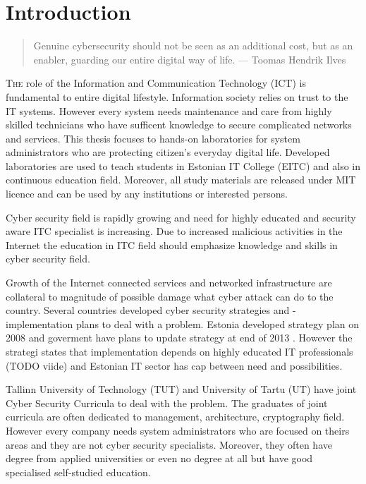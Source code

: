 \chapter{Introduction}
\label{Introduction}

 
\begin{quote}
Genuine cybersecurity should not be seen as an additional cost, but as an enabler, guarding our entire digital way of life. --- Toomas Hendrik Ilves
\end{quote}

\lettrine[lraise=0.1, nindent=0em, slope=-.5em]{\color{Violet}T}{he} role of the Information and Communication Technology (\gls{ICT}) is fundamental to entire digital lifestyle. Information society relies on trust to the IT systems. However every system needs maintenance and care from highly skilled technicians who have sufficent knowledge to secure complicated networks and services. This thesis focuses to hands-on laboratories for system administrators who are protecting citizen’s everyday digital life. Developed laboratories are used to teach students in Estonian IT College (\gls{EITC}) and also in continuous education field. Moreover, all study materials are released under MIT licence and can be used by any institutions or interested persons.

Cyber security field is rapidly growing and need for highly educated and security aware ITC specialist is increasing. Due to increased malicious activities in the Internet the education in ITC field should emphasize knowledge and skills in cyber security field.

Growth of the Internet connected services and networked infrastructure are collateral to magnitude of possible damage what cyber attack can do to the country. Several countries developed cyber security strategies and -implementation plans to deal with a problem.
Estonia developed strategy plan on 2008 \citep{Strategy2008} and goverment have plans to update strategy at end of 2013 \citep{StrategyProposal2013}. However the strategi states that implementation depends on highly educated IT professionals {\color{red}(TODO viide)} and Estonian IT sector has cap between need and possibilities.

Tallinn University of Technology (\gls{TUT}) and University of Tartu (\gls{UT}) have joint Cyber Security Curricula to deal with the problem. The graduates of joint curricula are often dedicated to management, architecture, cryptography field.  However every company needs system administrators who are focused on theirs areas and they are not cyber security specialists. Moreover, they often have degree from applied universities or even no degree at all but have good specialised self-studied education.

